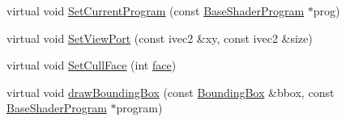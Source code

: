 \begin{DoxyCompactItemize}
\item 
virtual void \hyperlink{class_agmd_1_1_g_l_driver_a034ddd338f3f7e312d3844ba50e03a35}{Set\+Current\+Program} (const \hyperlink{class_agmd_1_1_base_shader_program}{Base\+Shader\+Program} $\ast$prog)
\item 
virtual void \hyperlink{class_agmd_1_1_g_l_driver_a8c86b2ef5e0ca9178e9ff16ee432a624}{Set\+View\+Port} (const ivec2 \&xy, const ivec2 \&size)
\item 
virtual void \hyperlink{class_agmd_1_1_g_l_driver_aeeb0c06849491a9fa62b46a8624d1734}{Set\+Cull\+Face} (int \hyperlink{_planet_8cpp_ae1161f79bdbe47164b23549af2139d25}{face})
\item 
virtual void \hyperlink{class_agmd_1_1_g_l_driver_ac182595e214c160ab8554c84f6d2da75}{draw\+Bounding\+Box} (const \hyperlink{class_agmd_1_1_bounding_box}{Bounding\+Box} \&bbox, const \hyperlink{class_agmd_1_1_base_shader_program}{Base\+Shader\+Program} $\ast$program)
\end{DoxyCompactItemize}
